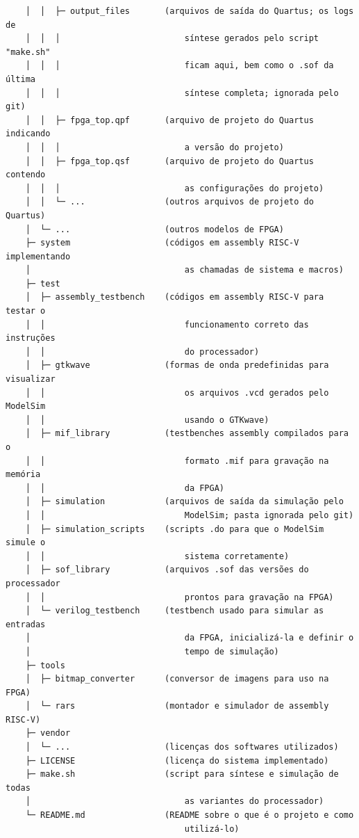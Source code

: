 {\begin{verbatim}
    │  │  ├─ output_files       (arquivos de saída do Quartus; os logs de
    │  │  │                         síntese gerados pelo script "make.sh"
    │  │  │                         ficam aqui, bem como o .sof da última
    │  │  │                         síntese completa; ignorada pelo git)
    │  │  ├─ fpga_top.qpf       (arquivo de projeto do Quartus indicando
    │  │  │                         a versão do projeto)
    │  │  ├─ fpga_top.qsf       (arquivo de projeto do Quartus contendo
    │  │  │                         as configurações do projeto)
    │  │  └─ ...                (outros arquivos de projeto do Quartus)
    │  └─ ...                   (outros modelos de FPGA)
    ├─ system                   (códigos em assembly RISC-V implementando
    │                               as chamadas de sistema e macros)
    ├─ test
    │  ├─ assembly_testbench    (códigos em assembly RISC-V para testar o
    │  │                            funcionamento correto das instruções
    │  │                            do processador)
    │  ├─ gtkwave               (formas de onda predefinidas para visualizar
    │  │                            os arquivos .vcd gerados pelo ModelSim
    │  │                            usando o GTKwave)
    │  ├─ mif_library           (testbenches assembly compilados para o
    │  │                            formato .mif para gravação na memória
    │  │                            da FPGA)
    │  ├─ simulation            (arquivos de saída da simulação pelo
    │  │                            ModelSim; pasta ignorada pelo git)
    │  ├─ simulation_scripts    (scripts .do para que o ModelSim simule o
    │  │                            sistema corretamente)
    │  ├─ sof_library           (arquivos .sof das versões do processador
    │  │                            prontos para gravação na FPGA)
    │  └─ verilog_testbench     (testbench usado para simular as entradas
    │                               da FPGA, inicializá-la e definir o
    │                               tempo de simulação)
    ├─ tools
    │  ├─ bitmap_converter      (conversor de imagens para uso na FPGA)
    │  └─ rars                  (montador e simulador de assembly RISC-V)
    ├─ vendor
    │  └─ ...                   (licenças dos softwares utilizados)
    ├─ LICENSE                  (licença do sistema implementado)
    ├─ make.sh                  (script para síntese e simulação de todas
    │                               as variantes do processador)
    └─ README.md                (README sobre o que é o projeto e como
                                    utilizá-lo)
\end{verbatim}
}


